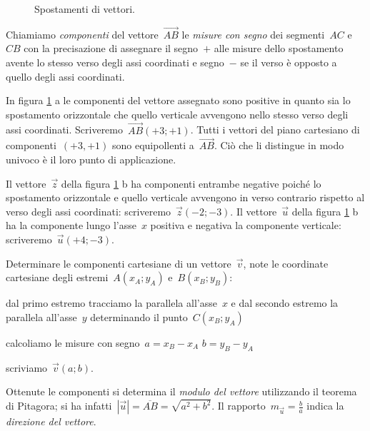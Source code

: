 \begin{inaccessibleblock}
 \begin{figure}[b]
\centering

\caption{Spostamenti di vettori.}\label{fig:F.4}
\end{figure}
\end{inaccessibleblock}


\begin{definizione}
Chiamiamo \emph{componenti} del vettore~$\overrightarrow{AB}$ le \emph{misure 
con segno} dei segmenti~$AC$ e~$CB$ con la precisazione di assegnare il 
segno~$+$ alle misure
dello spostamento avente lo stesso verso degli assi coordinati e segno~$-$ se 
il verso è opposto a quello degli assi coordinati.
\end{definizione}

In figura \ref{fig:F.4} a le componenti del vettore assegnato sono positive in 
quanto sia lo spostamento orizzontale che quello verticale avvengono nello 
stesso
verso degli assi coordinati. Scriveremo~$\overrightarrow{AB}(+3;+1)$. Tutti i 
vettori del piano cartesiano di componenti~$(+3,+1)$ sono equipollenti 
a~$\overrightarrow{AB}$.
Ciò che li distingue in modo univoco è il loro punto di applicazione.

\begin{esempio}
Il vettore~$\vec{z}$ della figura \ref{fig:F.4} b ha componenti entrambe 
negative poiché lo spostamento orizzontale e quello verticale avvengono in verso
contrario rispetto al verso degli assi coordinati: scriveremo~$\vec{z}(-2;-3)$. 
Il vettore~$\vec{u}$ della figura \ref{fig:F.4} b ha la componente
lungo l'asse~$x$ positiva e negativa la componente verticale: 
scriveremo~$\vec{u}(+4;-3)$.
\end{esempio}

\begin{procedura}
Determinare le componenti cartesiane di un vettore~$\vec{v}$, note le 
coordinate cartesiane degli estremi~$A(x_A;y_A)$ e~$B(x_B;y_B)$:
\begin{enumeratea}
\item dal primo estremo tracciamo la parallela all'asse~$x$ e dal secondo 
estremo la parallela all'asse~$y$ determinando il punto~$C(x_B;y_A)$
\item calcoliamo le misure con segno~$a=x_B-x_A$ $b=y_B-y_A$
\item scriviamo~$\vec{v}(a;b)$.
\end{enumeratea}
\end{procedura}
Ottenute le componenti si determina il \emph{modulo del vettore} utilizzando il 
teorema di Pitagora; si ha infatti~$|\vec{u}|=\overline{AB}=\sqrt{a^2+b^2}$.
Il rapporto~$m_{\vec{u}}=\frac{b}{a}$ indica la \emph{direzione del vettore}.

